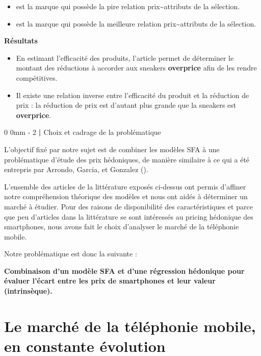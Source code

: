 \documentclass[
  12pt,
]{report}
\makeatletter
\providecommand{\tightlist}{%
  \setlength{\itemsep}{0pt}\setlength{\parskip}{0pt}}\usepackage{longtable,booktabs,array}
\renewcommand{\texttt}[1]{\colorbox{light}{\color{highlight}{\ttfamily{#1}}}}
\renewcommand{\chapter}{%
    \clearpage %
    \@startsection{chapter}%
    {0} %
    {0mm} %
    {-\baselineskip} %
    {2\baselineskip} %
    {\normalfont\Huge\bfseries | \Huge\bfseries}%
}
\makeatother
\begin{document}
\begin{itemize}
\tightlist
\item
  \texttt{Nike} est la marque qui possède la pire relation
  prix\textasciitilde attributs de la sélection.
\item
  \texttt{Saucony} est la marque qui possède la meilleure relation
  prix\textasciitilde attributs de la sélection.
\end{itemize}

\textbf{Résultats}

\begin{itemize}
\item
  En estimant l'efficacité des produits, l'article permet de déterminer
  le montant des réductions à accorder aux sneakers \textbf{overprice}
  afin de les rendre compétitives.
\item
  Il existe une relation inverse entre l'efficacité du produit et la
  réduction de prix : la réduction de prix est d'autant plus grande que
  la sneakers est \textbf{overprice}.
\end{itemize}

\chapter{Choix et cadrage de la
problématique}\label{choix-et-cadrage-de-la-probluxe9matique}

L'objectif fixé par notre sujet est de combiner les modèles SFA à une
problématique d'étude des prix hédoniques, de manière similaire à ce qui
a été entrepris par Arrondo, Garcia, et Gonzalez
().

L'ensemble des articles de la littérature exposés ci-dessus ont permis
d'affiner notre compréhension théorique des modèles et nous ont aidés à
déterminer un marché à étudier. Pour des raisons de disponibilité des
caractéristiques et parce que peu d'articles dans la littérature se sont
intéressés au pricing hédonique des smartphones, nous avons fait le
choix d'analyser le marché de la téléphonie mobile.

Notre problématique est donc la suivante :

\textbf{Combinaison d'un modèle SFA et d'une régression hédonique pour
évaluer l'écart entre les prix de smartphones et leur valeur
(intrinsèque).}

\section{Le marché de la téléphonie mobile, en constante
évolution}\label{le-marchuxe9-de-la-tuxe9luxe9phonie-mobile-en-constante-uxe9volution}
\end{document}
